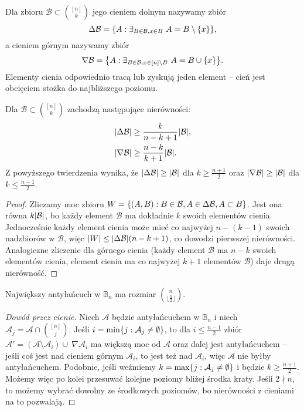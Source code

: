 \begin{definition}
	Dla zbioru \(\mathcal B \subset \displaystyle\binom{[n]}{k}\) jego cieniem
	dolnym nazywamy zbiór \[\Delta\mathcal B = \set{A : \exists_{B\in\mathcal B,
				x\in B} \ A=B\setminus\set{x}},\] a cieniem górnym nazywamy zbiór
	\[\nabla\mathcal B = \set{A : \exists_{B\in\mathcal B, x\in [n]\setminus B} \
			A=B\cup\set{x}}.\] Elementy cienia odpowiednio tracą lub zyskują jeden element
	-- cień jest obcięciem stożka do najbliższego poziomu.
\end{definition}

\begin{theorem}
	Dla $\mathcal B \subset \displaystyle\binom{[n]}{k}$ zachodzą następujące nierówności:
	\begin{align*}
		\card{\Delta\mathcal B} & \ge \frac k{n-k+1}\card{\mathcal B},   \\
		\card{\nabla\mathcal B} & \ge \frac {n-k}{k+1}\card{\mathcal B}. \\
	\end{align*}
	Z powyższego twierdzenia wynika, że $\card{\Delta\mathcal B} \ge \card{\mathcal B}$ dla $k \ge
		\frac {n+1}2$ oraz $\card{\nabla\mathcal B} \ge \card{\mathcal B}$ dla $k \le \frac {n-1}2$.
\end{theorem}
\begin{proof}
	Zliczamy moc zbioru
	$W = \set{(A,B) : B\in\mathcal B, A\in\Delta\mathcal B, A\subset B}$.
	Jest ona równa $k\card{\mathcal B}$, bo każdy element $\mathcal B$ ma dokładnie $k$
	swoich elementów cienia. Jednocześnie każdy element cienia może mieć co najwyżej
	$n-(k-1)$ swoich nadzbiorów w $\mathcal B$, więc $\card W \le \card{\Delta\mathcal B}(n-k+1)$,
	co dowodzi pierwszej nierówności.
	Analogiczne zliczenie dla górnego cienia (każdy element $\mathcal B$ ma $n-k$
	swoich elementów cienia, element cienia ma co najwyżej $k+1$ elementów
	$\mathcal B$) daje drugą nierówność.
\end{proof}

\begin{theorem}
	Największy antyłańcuch w $\mathbb B_n$ ma rozmiar $\binom{n}{\lfloor \frac n2
			\rfloor}$.
\end{theorem}
\begin{proof}[Dowód przez cienie]
	Niech $\mathcal A$ będzie antyłańcuchem w $\mathbb B_n$ i niech $\mathcal A_j
		= \mathcal A \cap \binom{[n]}{j}$. Jeśli $i = \min\set{j : \mathcal
			A_j\ne\emptyset}$, to dla $i\le \frac{n-1}2$ zbiór $\mathcal A' = (\mathcal
		A\setminus \mathcal A_i)\cup \ \nabla\mathcal A_i$ ma większą moc od
	$\mathcal{A}$ oraz dalej jest antyłańcuchem -- jeśli coś jest nad cieniem
	górnym $\mathcal A_i$, to jest też nad $\mathcal A_i$, więc $\mathcal A$ nie
	byłby antyłańcuchem. Podobnie, jeśli weźmiemy $k = \max\set{j : \mathcal
			A_j\ne\emptyset}$ i będzie $k\ge \frac{n+1}2$. Możemy więc po kolei przesuwać
	kolejne poziomy bliżej środka kraty. Jeśli $2\nmid n$, to możemy wybrać
	dowolny ze środkowych poziomów, bo nierówności z cieniami na to pozwalają.
\end{proof}

